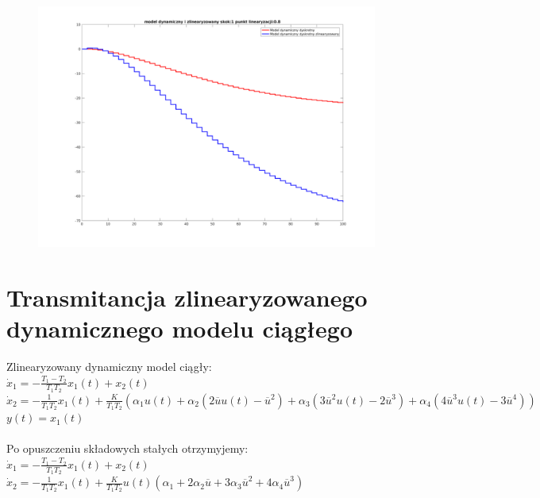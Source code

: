 \documentclass[a4paper, 11pt]{article}
\begin{document}
\begin{figure}[H]
\centering
\includegraphics[scale=0.45]{918.png}
\end{figure}



\section{Transmitancja zlinearyzowanego dynamicznego modelu ciągłego}
Zlinearyzowany dynamiczny model ciągły: 
\\

$\dot{x}_1 = -\frac{T_{1}-T_{2}}{T_{1}T_{2}}x_{1}(t) +x_{2}(t)$
\\

$\dot{x}_2 = -\frac{1}{T_{1}T_{2}}x_{1}(t) + \frac{K}{T_{1}T_{2}}(\alpha_1u(t)+\alpha_2(2\overline{u}u(t) - \overline{u}^2)+ \alpha_3(3\overline{u}^2u(t)-2\overline{u}^3) + \alpha_4(4\overline{u}^3u(t) - 3\overline{u}^4))$
\\

$y(t) = x_{1}(t)$
\\
\\

\noindent Po opuszczeniu składowych stałych otrzymyjemy: 
\\

$\dot{x}_1 = -\frac{T_{1}-T_{2}}{T_{1}T_{2}}x_{1}(t) +x_{2}(t)$
\\

$\dot{x}_2 = -\frac{1}{T_{1}T_{2}}x_{1}(t) + \frac{K}{T_{1}T_{2}}u(t)(\alpha_1+2\alpha_2\overline{u}+3\alpha_3\overline{u}^2+4\alpha_4\overline{u}^3)$
\\
\end{document}
